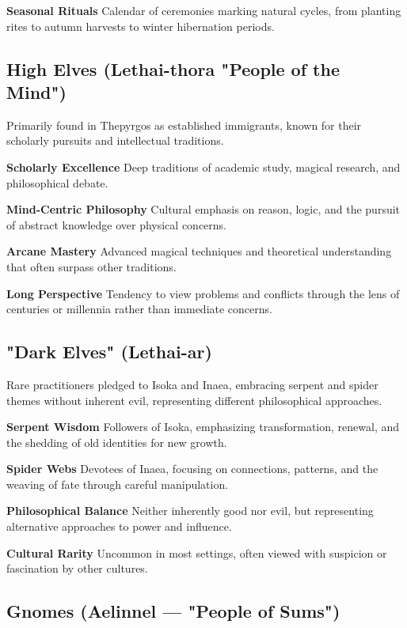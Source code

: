 \documentclass[11pt,twoside,openany]{book}
\begin{document}
\textbf{Seasonal Rituals} Calendar of ceremonies marking natural cycles, from planting rites to autumn harvests to winter hibernation periods.

\subsection*{High Elves (Lethai-thora "People of the Mind")}

Primarily found in Thepyrgos as established immigrants, known for their scholarly pursuits and intellectual traditions.

\textbf{Scholarly Excellence} Deep traditions of academic study, magical research, and philosophical debate.

\textbf{Mind-Centric Philosophy} Cultural emphasis on reason, logic, and the pursuit of abstract knowledge over physical concerns.

\textbf{Arcane Mastery} Advanced magical techniques and theoretical understanding that often surpass other traditions.

\textbf{Long Perspective} Tendency to view problems and conflicts through the lens of centuries or millennia rather than immediate concerns.

\subsection*{"Dark Elves" (Lethai-ar)}

Rare practitioners pledged to Isoka and Inaea, embracing serpent and spider themes without inherent evil, representing different philosophical approaches.

\textbf{Serpent Wisdom} Followers of Isoka, emphasizing transformation, renewal, and the shedding of old identities for new growth.

\textbf{Spider Webs} Devotees of Inaea, focusing on connections, patterns, and the weaving of fate through careful manipulation.

\textbf{Philosophical Balance} Neither inherently good nor evil, but representing alternative approaches to power and influence.

\textbf{Cultural Rarity} Uncommon in most settings, often viewed with suspicion or fascination by other cultures.

\subsection*{Gnomes (Aelinnel — "People of Sums")}
\end{document}
